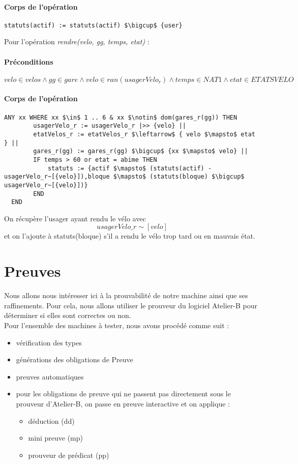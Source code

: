 \documentclass[12pt]{article}
\begin{document}
\paragraph{Corps de l'opération}
\textbf{}
\begin{lstlisting}[mathescape]
  statuts(actif) := statuts(actif) $\bigcup$ {user}
\end{lstlisting}
\newpage
Pour l'opération \textit{rendre(velo, gg, temps, etat)} :
\paragraph{Préconditions}
\[ velo \in velos \land gg \in gare \land velo \in ran(usagerVelo_r) \land temps \in NAT1 \land etat \in ETATSVELO\]
\paragraph{Corps de l'opération}
\textbf{}
\begin{lstlisting}[mathescape]
  ANY xx WHERE xx $\in$ 1 .. 6 & xx $\notin$ dom(gares_r(gg)) THEN
        usagerVelo_r := usagerVelo_r |>> {velo} ||
        etatVelos_r := etatVelos_r $\leftarrow$ { velo $\mapsto$ etat } ||
        gares_r(gg) := gares_r(gg) $\bigcup$ {xx $\mapsto$ velo} ||
        IF temps > 60 or etat = abime THEN
            statuts := {actif $\mapsto$ (statuts(actif) - usagerVelo_r~[{velo}]),bloque $\mapsto$ (statuts(bloque) $\bigcup$ usagerVelo_r~[{velo}])}
        END
  END
\end{lstlisting}
On récupère l'usager ayant rendu le vélo avec \[usagerVelo\_r\sim[{velo}]\] et on l'ajoute à statuts(bloque) s'il a rendu le vélo trop tard ou en mauvais état.
\newpage
\section{Preuves}
Nous allons nous intéresser ici à la prouvabilité de notre machine ainsi que ses raffinements. Pour cela, nous allons utiliser le prouveur du logiciel Atelier-B pour déterminer si elles sont correctes ou non.\\

Pour l'ensemble des machines à tester, nous avons procédé comme suit :
\begin{itemize}
  \item vérification des types
  \item générations des obligations de Preuve
  \item preuves automatiques
  \item pour les obligations de preuve qui ne passent pas directement sous le prouveur d'Atelier-B, on passe en preuve interactive et on applique :
  \begin{itemize}
    \item déduction (dd)
    \item mini preuve (mp)
    \item prouveur de prédicat (pp)
  \end{itemize}
\end{itemize}
\end{document}
